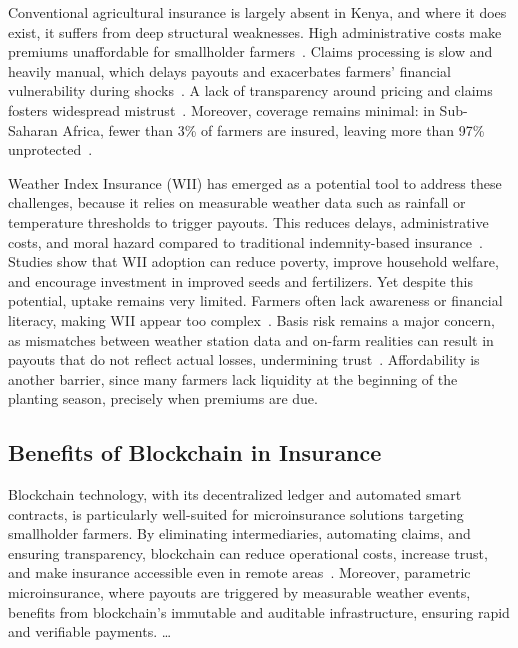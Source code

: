 \documentclass[11pt,a4paper]{article}
\begin{document}
    Conventional agricultural insurance is largely absent in Kenya, and where it does exist, it suffers from deep structural weaknesses.
    High administrative costs make premiums unaffordable for smallholder farmers~\parencite{Dominguez2024}.
    Claims processing is slow and heavily manual, which delays payouts and exacerbates farmers’ financial vulnerability during shocks~\parencite{Chainlink2021}.
    A lack of transparency around pricing and claims fosters widespread mistrust~\parencite{Dominguez2024}.
    Moreover, coverage remains minimal: in Sub-Saharan Africa, fewer than 3\% of farmers are insured, leaving more than 97\% unprotected~\parencite{WorldBank2022}.

    Weather Index Insurance (WII) has emerged as a potential tool to address these challenges, because it relies on measurable weather data such as rainfall or temperature thresholds to trigger payouts.
    This reduces delays, administrative costs, and moral hazard compared to traditional indemnity-based insurance~\parencite{Baagoe2020,Sibiko2018}.
    Studies show that WII adoption can reduce poverty, improve household welfare, and encourage investment in improved seeds and fertilizers.
    Yet despite this potential, uptake remains very limited.
    Farmers often lack awareness or financial literacy, making WII appear too complex~\parencite{Janzen2020}.
    Basis risk remains a major concern, as mismatches between weather station data and on-farm realities can result in payouts that do not reflect actual losses, undermining trust~\parencite{Jensen2016}.
    Affordability is another barrier, since many farmers lack liquidity at the beginning of the planting season, precisely when premiums are due.

    \subsection{Benefits of Blockchain in Insurance}\label{subsec:blockchain-benefits}
    Blockchain technology, with its decentralized ledger and automated smart contracts, is particularly well-suited for microinsurance solutions targeting smallholder farmers.
    By eliminating intermediaries, automating claims, and ensuring transparency, blockchain can reduce operational costs, increase trust, and make insurance accessible even in remote areas~\parencite{Dominguez2024,Shetty2022}.
    Moreover, parametric microinsurance, where payouts are triggered by measurable weather events, benefits from blockchain’s immutable and auditable infrastructure, ensuring rapid and verifiable payments. \ldots
\end{document}
